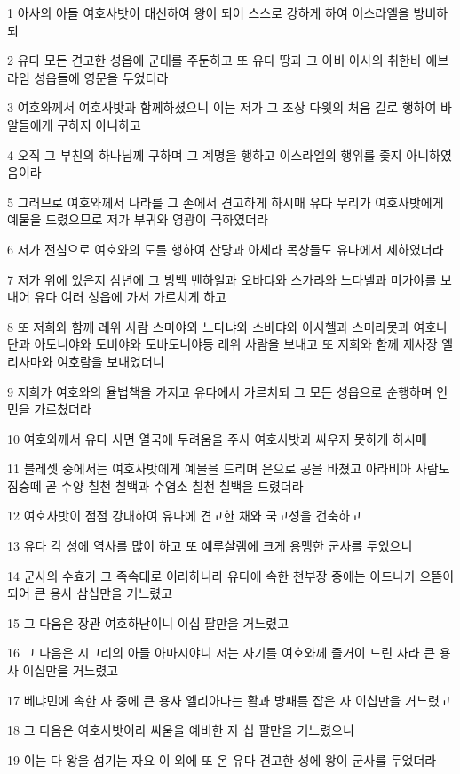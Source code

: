 \par 1 아사의 아들 여호사밧이 대신하여 왕이 되어 스스로 강하게 하여 이스라엘을 방비하되
\par 2 유다 모든 견고한 성읍에 군대를 주둔하고 또 유다 땅과 그 아비 아사의 취한바 에브라임 성읍들에 영문을 두었더라
\par 3 여호와께서 여호사밧과 함께하셨으니 이는 저가 그 조상 다윗의 처음 길로 행하여 바알들에게 구하지 아니하고
\par 4 오직 그 부친의 하나님께 구하며 그 계명을 행하고 이스라엘의 행위를 좇지 아니하였음이라
\par 5 그러므로 여호와께서 나라를 그 손에서 견고하게 하시매 유다 무리가 여호사밧에게 예물을 드렸으므로 저가 부귀와 영광이 극하였더라
\par 6 저가 전심으로 여호와의 도를 행하여 산당과 아세라 목상들도 유다에서 제하였더라
\par 7 저가 위에 있은지 삼년에 그 방백 벤하일과 오바댜와 스가랴와 느다넬과 미가야를 보내어 유다 여러 성읍에 가서 가르치게 하고
\par 8 또 저희와 함께 레위 사람 스마야와 느다냐와 스바댜와 아사헬과 스미라못과 여호나단과 아도니야와 도비야와 도바도니야등 레위 사람을 보내고 또 저희와 함께 제사장 엘리사마와 여호람을 보내었더니
\par 9 저희가 여호와의 율법책을 가지고 유다에서 가르치되 그 모든 성읍으로 순행하며 인민을 가르쳤더라
\par 10 여호와께서 유다 사면 열국에 두려움을 주사 여호사밧과 싸우지 못하게 하시매
\par 11 블레셋 중에서는 여호사밧에게 예물을 드리며 은으로 공을 바쳤고 아라비아 사람도 짐승떼 곧 수양 칠천 칠백과 수염소 칠천 칠백을 드렸더라
\par 12 여호사밧이 점점 강대하여 유다에 견고한 채와 국고성을 건축하고
\par 13 유다 각 성에 역사를 많이 하고 또 예루살렘에 크게 용맹한 군사를 두었으니
\par 14 군사의 수효가 그 족속대로 이러하니라 유다에 속한 천부장 중에는 아드나가 으뜸이 되어 큰 용사 삼십만을 거느렸고
\par 15 그 다음은 장관 여호하난이니 이십 팔만을 거느렸고
\par 16 그 다음은 시그리의 아들 아마시야니 저는 자기를 여호와께 즐거이 드린 자라 큰 용사 이십만을 거느렸고
\par 17 베냐민에 속한 자 중에 큰 용사 엘리아다는 활과 방패를 잡은 자 이십만을 거느렸고
\par 18 그 다음은 여호사밧이라 싸움을 예비한 자 십 팔만을 거느렸으니
\par 19 이는 다 왕을 섬기는 자요 이 외에 또 온 유다 견고한 성에 왕이 군사를 두었더라

